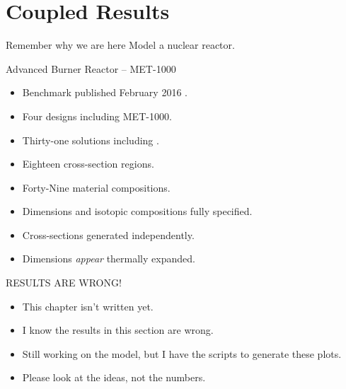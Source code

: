 \section{Coupled Results}
\label{sec:coupledResults}

\begin{frame}{Remember why we are here}
  \pause
  \huge Model a nuclear reactor.
\end{frame}

\begin{frame}{Advanced Burner Reactor -- MET-1000}
  \begin{itemize}
    \item Benchmark published February 2016 \cite{abr}.
    \item Four designs including MET-1000.
    \item Thirty-one solutions including \dif.
  \end{itemize}
  \vspace{0.2in}
  \begin{itemize}
    \item Eighteen cross-section regions.
    \item Forty-Nine material compositions.
    \item Dimensions and isotopic compositions fully specified.
  \end{itemize}
  \vspace{0.2in}
  \begin{itemize}
    \item Cross-sections generated independently.
    \item Dimensions \textit{appear} thermally expanded.
  \end{itemize}
\end{frame}

\begin{frame}{RESULTS ARE WRONG!}
  \begin{itemize}
    \item This chapter isn't written yet.
    \item I know the results in this section are wrong.
    \item Still working on the model, but I have the scripts to generate these
      plots.
    \item Please look at the ideas, not the numbers.
  \end{itemize}
\end{frame}

